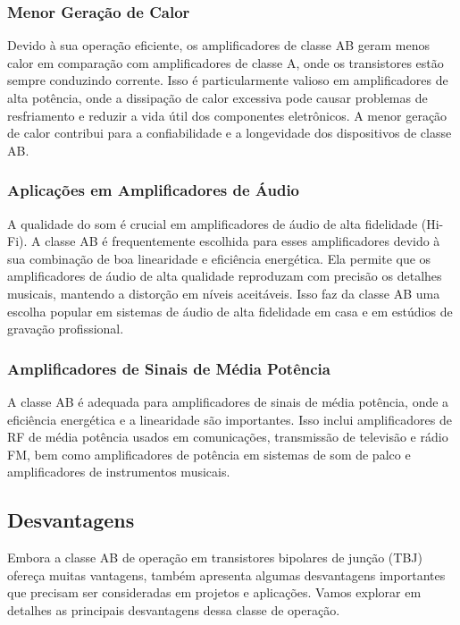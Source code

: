 \subsubsection{Menor Geração de Calor}

Devido à sua operação eficiente, os amplificadores de classe AB geram menos calor em comparação com amplificadores de classe A, onde os transistores estão sempre conduzindo corrente. Isso é particularmente valioso em amplificadores de alta potência, onde a dissipação de calor excessiva pode causar problemas de resfriamento e reduzir a vida útil dos componentes eletrônicos. A menor geração de calor contribui para a confiabilidade e a longevidade dos dispositivos de classe AB.

\subsubsection{Aplicações em Amplificadores de Áudio}

A qualidade do som é crucial em amplificadores de áudio de alta fidelidade (Hi-Fi). A classe AB é frequentemente escolhida para esses amplificadores devido à sua combinação de boa linearidade e eficiência energética. Ela permite que os amplificadores de áudio de alta qualidade reproduzam com precisão os detalhes musicais, mantendo a distorção em níveis aceitáveis. Isso faz da classe AB uma escolha popular em sistemas de áudio de alta fidelidade em casa e em estúdios de gravação profissional.

\subsubsection{Amplificadores de Sinais de Média Potência}

A classe AB é adequada para amplificadores de sinais de média potência, onde a eficiência energética e a linearidade são importantes. Isso inclui amplificadores de RF de média potência usados em comunicações, transmissão de televisão e rádio FM, bem como amplificadores de potência em sistemas de som de palco e amplificadores de instrumentos musicais.

\subsection{Desvantagens}

Embora a classe AB de operação em transistores bipolares de junção (TBJ) ofereça muitas vantagens, também apresenta algumas desvantagens importantes que precisam ser consideradas em projetos e aplicações. Vamos explorar em detalhes as principais desvantagens dessa classe de operação.

